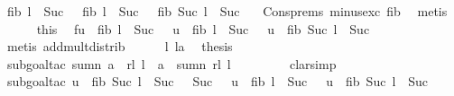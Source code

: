 \begin{isabellebody}
\ {\isachardoublequoteopen}{\isacharparenleft}fib\ l\ {\isacharminus}\ Suc\ {}{\isacharparenright}\ {\isacharplus}\ fib\ {\isacharparenleft}l\ {\isacharminus}\ Suc\ {}{\isacharparenright}\ {\isacharequal}\ {\isacharparenleft}fib\ {\isacharparenleft}Suc\ l{\isacharparenright}\ {\isacharminus}\ Suc\ {}{\isacharparenright}{\isachardoublequoteclose}\ \isamarkupfalse%
\ Cons{\isachardot}prems{\isacharparenleft}{}{\isacharparenright}\ minus{\isacharunderscore}exc\ fib{\isacharunderscore}{}\ \isamarkupfalse%
\ metis\isanewline
\ \ \ \ \isamarkupfalse%
\ this\ \isamarkupfalse%
\ f{}{\isacharcolon}{\isachardoublequoteopen}u\ {\isacharasterisk}\ {\isacharparenleft}fib\ l\ {\isacharminus}\ Suc\ {}{\isacharparenright}\ {\isacharplus}\ u\ {\isacharasterisk}\ fib\ {\isacharparenleft}l\ {\isacharminus}\ Suc\ {}{\isacharparenright}\ {\isacharequal}\ u\ {\isacharasterisk}\ {\isacharparenleft}fib\ {\isacharparenleft}Suc\ l{\isacharparenright}\ {\isacharminus}\ Suc\ {}{\isacharparenright}{\isachardoublequoteclose}\ \isamarkupfalse%
\ {\isacharparenleft}metis\ add{\isacharunderscore}mult{\isacharunderscore}distrib{}{\isacharparenright}\isanewline
\ \ \ \ \isamarkupfalse%
\ l{}\ la\ \isamarkupfalse%
\ {\isacharquery}thesis\ \isanewline
\ \ \ \ \ \ \isamarkupfalse%
\ {\isacharparenleft}subgoal{\isacharunderscore}tac\ {\isachardoublequoteopen}sumn\ {\isacharparenleft}a\ {\isacharhash}\ rl{\isacharparenright}\ l\ {\isacharequal}\ a\ {\isacharplus}\ sumn\ rl\ {\isacharparenleft}l{\isacharminus}{}{\isacharparenright}{\isachardoublequoteclose}{\isacharparenright}\isanewline
\ \ \ \ \ \ \ \isamarkupfalse%
\ clarsimp\isanewline
\ \ \ \ \ \ \ \isamarkupfalse%
\ {\isacharparenleft}subgoal{\isacharunderscore}tac\ {\isachardoublequoteopen}u\ {\isacharasterisk}\ {\isacharparenleft}fib\ {\isacharparenleft}Suc\ {\isacharparenleft}l\ {\isacharminus}\ Suc\ {}{\isacharparenright}{\isacharparenright}\ {\isacharminus}\ Suc\ {}{\isacharparenright}\ {\isacharplus}\ u\ {\isacharasterisk}\ fib\ {\isacharparenleft}l\ {\isacharminus}\ Suc\ {}{\isacharparenright}\ {\isacharequal}\ u\ {\isacharasterisk}\ {\isacharparenleft}fib\ {\isacharparenleft}Suc\ l{\isacharparenright}\ {\isacharminus}\ Suc\ {}{\isacharparenright}{\isachardoublequoteclose}\ \isanewline

\end{isabellebody}
